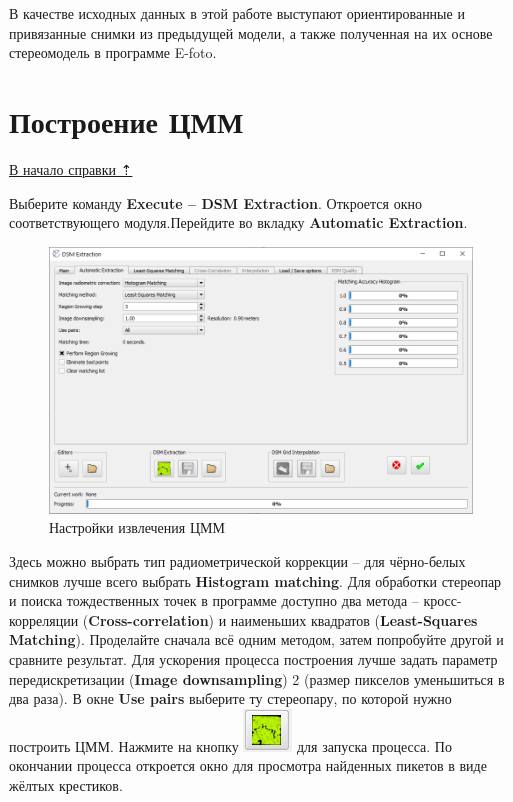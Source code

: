 \documentclass[
  12pt,
]{book}
\begin{document}
В качестве исходных данных в этой работе выступают ориентированные и привязанные снимки из предыдущей модели, а также полученная на их основе стереомодель в программе E-foto.

\hypertarget{dem-create}{%
\section{Построение ЦММ}\label{dem-create}}

\protect\hyperlink{dem}{В начало справки ⇡}

Выберите команду \textbf{Execute -- DSM Extraction}. Откроется окно соответствующего модуля.Перейдите во вкладку \textbf{Automatic Extraction}.

\begin{figure}
\centering
\includegraphics{images/Ref14/Automatic_Extraction.png}
\caption{Настройки извлечения ЦММ}
\end{figure}

Здесь можно выбрать тип радиометрической коррекции -- для чёрно-белых снимков лучше всего выбрать \textbf{Histogram matching}. Для обработки стереопар и поиска тождественных точек в программе доступно два метода -- кросс-корреляции (\textbf{Cross-correlation}) и наименьших квадратов (\textbf{Least-Squares Matching}). Проделайте сначала всё одним методом, затем попробуйте другой и сравните результат. Для ускорения процесса построения лучше задать параметр передискретизации (\textbf{Image downsampling}) 2 (размер пикселов уменьшиться в два раза). В окне \textbf{Use pairs} выберите ту стереопару, по которой нужно построить ЦММ. Нажмите на кнопку \includegraphics{images/Ref14/DSM_extraction.png} для запуска процесса. По окончании процесса откроется окно для просмотра найденных пикетов в виде жёлтых крестиков.
\end{document}
